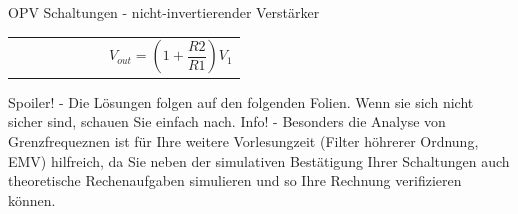 \begin{frame}[t]{OPV Schaltungen - nicht-invertierender Verstärker}
\begin{spacing}{0.6}
\begin{tiny}
\begin{table}[h!]
\begin{tabular}{p{5cm} p{5cm}}
\begin{minipage}{.5\textwidth}
\begin{figure}
                \end{figure}
                \end{minipage} 
                & 
                \begin{minipage}{.5\textwidth}
                \begin{equation}
                  V_{out}=(1+\frac{R2}{R1})V_{1}
                  \end{equation}
                \end{minipage} 
              \end{tabular}
            
            \end{table}

            Spoiler! - Die Lösungen folgen auf den folgenden Folien. Wenn sie sich nicht sicher sind, schauen Sie einfach nach.\newline\newline
            Info! - Besonders die Analyse von Grenzfrequeznen ist für Ihre weitere Vorlesungzeit (Filter höhrerer Ordnung, EMV) hilfreich,
            da Sie neben der simulativen Bestätigung Ihrer Schaltungen auch theoretische Rechenaufgaben simulieren und so Ihre Rechnung
            verifizieren können.
            
            \end{tiny} \end{spacing}
           \end{frame}


